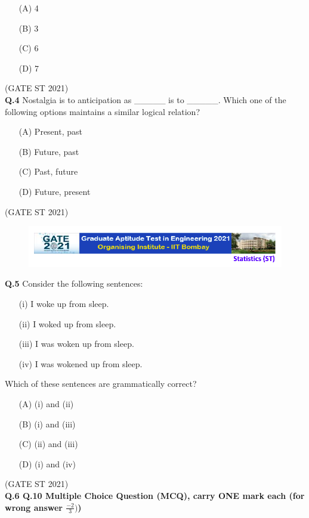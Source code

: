 \documentclass[journal,12pt,onecolumn]{IEEEtran}
\theoremstyle{remark}
\begin{document}
\begin{enumerate}
\item[(A)] 4
\item[(B)] 3
\item[(C)] 6
\item[(D)] 7
\end{enumerate}

\hfill (GATE ST 2021) \\

\textbf{Q.4}
Nostalgia is to anticipation as \_\_\_\_\_ is to \_\_\_\_\_.  
Which one of the following options maintains a similar logical relation?

\begin{enumerate}
\item[(A)] Present, past
\item[(B)] Future, past
\item[(C)] Past, future
\item[(D)] Future, present
\end{enumerate}
\hfill (GATE ST 2021)

\begin{figure}
 \centering
    \includegraphics[width=1\linewidth]{figs/0.png} 
\end{figure}

\textbf{Q.5}
Consider the following sentences:
\begin{enumerate}
\item[(i)] I woke up from sleep.
\item[(ii)] I woked up from sleep.
\item[(iii)] I was woken up from sleep.
\item[(iv)] I was wokened up from sleep.
\end{enumerate}
Which of these sentences are grammatically correct?
\begin{enumerate}
\item[(A)] (i) and (ii)
\item[(B)] (i) and (iii)
\item[(C)] (ii) and (iii)
\item[(D)] (i) and (iv)
\end{enumerate}
\hfill (GATE ST 2021)\\


\textbf{Q.6 \text{-} Q.10 Multiple Choice Question (MCQ), carry ONE mark each (for wrong answer $\frac{-2}{3})$)}
\end{document}
